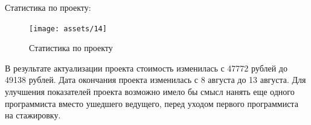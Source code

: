 Статистика по проекту:

\begin{figure}[H]
    \begin{center}
    \texttt{[image: assets/14]}
    \caption{Статистика по проекту}
    \label{fig:14}
    \end{center}
\end{figure}

В результате актуализации проекта стоимость изменилась с 47772 рублей до 49138 рублей. Дата окончания проекта изменилась с 8 августа до 13 августа. Для улучшения показателей проекта возможно имело бы смысл нанять еще одного программиста вместо ушедшего ведущего, перед уходом первого программиста на стажировку.
